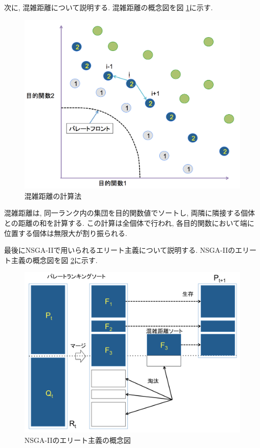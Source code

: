 \documentclass[11pt,a4j,notitlepage]{jreport}
\begin{document}
次に, 混雑距離について説明する.
混雑距離の概念図を図 \ref{fig:crowd}に示す.

\begin{figure}[htbp]
  \begin{center}
    \includegraphics[width=0.7\linewidth]{img/Crowd.png}
                \setlength{\abovecaptionskip}{0mm}
    \setlength{\belowcaptionskip}{0mm}
      \caption{混雑距離の計算法}
  \label{fig:crowd}
  \end{center}
\end{figure}


混雑距離は, 同一ランク内の集団を目的関数値でソートし, 両隣に隣接する個体との距離の和を計算する.
この計算は全個体で行われ, 各目的関数において端に位置する個体は無限大が割り振られる.

最後にNSGA-IIで用いられるエリート主義について説明する.
NSGA-IIのエリート主義の概念図を図 \ref{fig:nsgaii}に示す.
\begin{figure}[htbp]
  \begin{center}
    \includegraphics[width=0.7\linewidth]{img/NSGAII.png}
                \setlength{\abovecaptionskip}{0mm}
    \setlength{\belowcaptionskip}{0mm}
      \caption{NSGA-IIのエリート主義の概念図}
  \label{fig:nsgaii}
  \end{center}
\end{figure}
\end{document}
